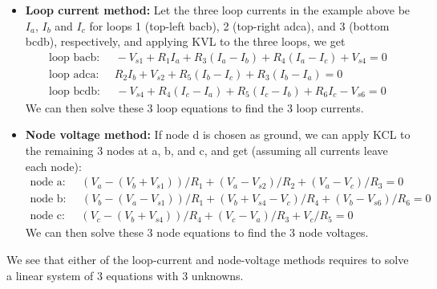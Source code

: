 \begin{itemize}
\begin{comment}
\item {\bf Branch current method:}

  There are $n=4$ nodes (a,b,c,d) and $b=6$ branches in the circuit, 
  therefore we can get $n-1=4-1=3$ independent node equations (first
  three) and $b-(n-1)=6-3=3$ independent loop equations (second three):
  \[ \begin{array}{l}
    \mbox{node a:}\;\;\;\;\; I_1+I_2-I_3=0 	\\
    \mbox{node b:}\;\;\;\;\;-I_1-I_4-I_6=0 	\\
    \mbox{node d:}\;\;\;\;\;-I_2+I_5+I_6=0 	\\
    \mbox{loop 1:}\;\;\;\;\;-V_{s1}+I_1R_1+I_3R_3-I_4R_4+V_{s4}=0 \\
    \mbox{loop 2:}\;\;\;\;\;-I_2R_2+V_{s2}-I_5R_5-I_3R_3=0	 \\
    \mbox{loop 3:}\;\;\;\;\;-V_{s4}+I_4R_4+I_5R_5-I_6R_6-V_{s6}=0 
  \end{array} \]
  Solving these 6 equations we get the 6 branch currents.
\end{comment}

\item {\bf Loop current method:}
  Let the three loop currents in the example above be $I_a$, $I_b$ and $I_c$ 
  for loops 1 (top-left bacb), 2 (top-right adca), and 3 (bottom bcdb),
  respectively, and applying KVL to the three loops, we get
  \[ 
  \begin{array}{l}
    \mbox{loop bacb:}\;\;\;\;\;-V_{s1}+R_1I_a+R_3(I_a-I_b)+R_4(I_a-I_c)+V_{s4}=0 \\
    \mbox{loop adca:}\;\;\;\;\;R_2I_b+V_{s2}+R_5(I_b-I_c)+R_3(I_b-I_a)=0 \\
    \mbox{loop bcdb:}\;\;\;\;\;-V_{s4}+R_4(I_c-I_a)+R_5(I_c-I_b)+R_6I_c-V_{s6}=0 
  \end{array} 
  \]
  We can then solve these 3 loop equations to find the 3 loop currents.

\item {\bf Node voltage method:}
  If node d is chosen as ground, we can apply KCL to the remaining 3 nodes 
  at a, b, and c, and get (assuming all currents leave each node):
  \[ 
  \begin{array}{l}
    \mbox{node a:}\;\;\;\;\;(V_a-(V_b+V_{s1}))/R_1+(V_a-V_{s2})/R_2+(V_a-V_c)/R_3=0 \\
    \mbox{node b:}\;\;\;\;\;(V_b-(V_a-V_{s1}))/R_1+(V_b+V_{s4}-V_c)/R_4+(V_b-V_{s6})/R_6=0 \\
    \mbox{node c:}\;\;\;\;\;(V_c-(V_b+V_{s4}))/R_4+(V_c-V_a)/R_3+V_c/R_5=0 
  \end{array} 
  \]
  We can then solve these 3 node equations to find the 3 node voltages.

\end{itemize}
We see that either of the loop-current and node-voltage methods requires 
to solve a linear system of 3 equations with 3 unknowns. 

